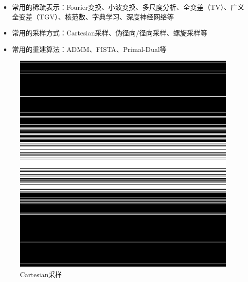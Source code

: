 \documentclass{beamer}
\begin{document}
\begin{frame}
	\begin{itemize}
		\item 常用的稀疏表示：Fourier变换、小波变换、多尺度分析、全变差（TV）、广义全变差（TGV）、核范数、字典学习、深度神经网络等
		\item 常用的采样方式：Cartesian采样、伪径向/径向采样、螺旋采样等
		\item 常用的重建算法：ADMM、FISTA、Primal-Dual等
	\end{itemize}
\begin{figure}[htbp]
\begin{minipage}[t]{0.3\textwidth}
\centering
\includegraphics[width=\textwidth]{../img/intro/cartesian.png}
\\ Cartesian采样
\end{minipage}
\hfill
\begin{minipage}[t]{0.3\textwidth}
\centering

\end{minipage}
\end{figure}
\end{frame}
\end{document}
